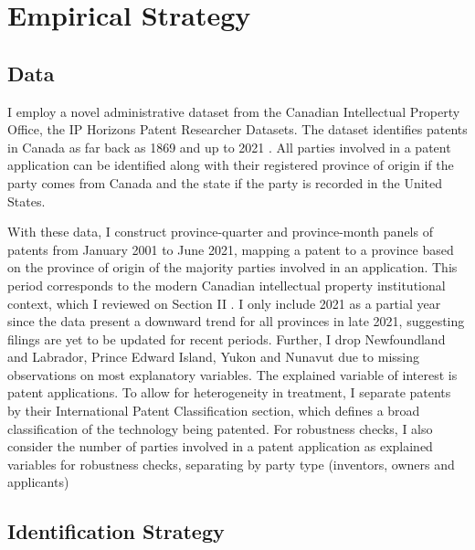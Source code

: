 \documentclass[../main.tex]{subfiles}
\begin{document}
\section{Empirical Strategy}
\label{sec:empirical_strategy}

\subsection{Data}

I employ a novel administrative dataset from the Canadian Intellectual Property Office, the IP Horizons Patent Researcher Datasets. The dataset identifies patents in Canada as far back as 1869 and up to 2021 \parencite{patents_cipo_datasets}. All parties involved in a patent application can be identified along with their registered province of origin if the party comes from Canada and the state if the party is recorded in the United States.  

With these data, I construct province-quarter and province-month panels of patents from January 2001 to June 2021, mapping a patent to a province based on the province of origin of the majority parties involved in an application. This period corresponds to the modern Canadian intellectual property institutional context, which I reviewed on Section II . I only include 2021 as a partial year since the data present a downward trend for all provinces in late 2021, suggesting filings are yet to be updated for recent periods. Further, I drop Newfoundland and Labrador, Prince Edward Island, Yukon and Nunavut due to missing observations on most explanatory variables. The explained variable of interest is patent applications. To allow for heterogeneity in treatment, I separate patents by their International Patent Classification section, which defines a broad classification of the technology being patented. For robustness checks, I also consider the number of parties involved in a patent application as explained variables for robustness checks, separating by party type (inventors, owners and applicants)


\subsection{Identification Strategy}
\end{document}
